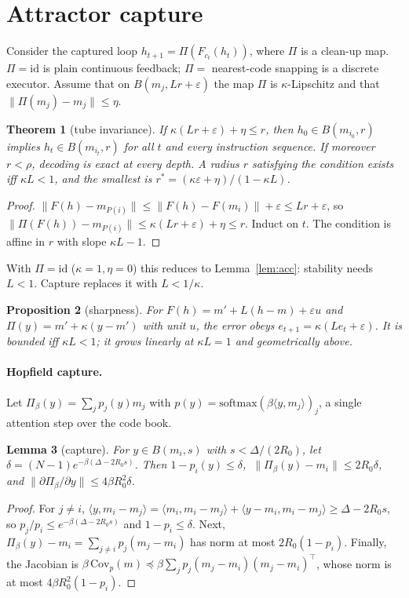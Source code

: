 \documentclass[11pt]{article}
\newtheorem{theorem}{Theorem}
\newtheorem{proposition}[theorem]{Proposition}
\newtheorem{lemma}[theorem]{Lemma}
\theoremstyle{definition}
\theoremstyle{remark}
\newcommand{\norm}[1]{\lVert #1\rVert}
\newcommand{\ip}[2]{\langle #1, #2\rangle}
\begin{document}
\section{Attractor capture}\label{sec:capture}

Consider the captured loop $h_{t+1}=\Pi(F_{c_t}(h_t))$, where $\Pi$ is a clean-up map. $\Pi=\mathrm{id}$
is plain continuous feedback; $\Pi=$ nearest-code snapping is a discrete executor. Assume that on
$B(m_j,Lr+\varepsilon)$ the map $\Pi$ is $\kappa$-Lipschitz and that $\norm{\Pi(m_j)-m_j}\le\eta$.

\begin{theorem}[tube invariance]\label{thm:tube}
If $\kappa(Lr+\varepsilon)+\eta\le r$, then $h_0\in B(m_{i_0},r)$ implies $h_t\in B(m_{i_t},r)$
for all $t$ and every instruction sequence. If moreover $r<\rho$, decoding is exact at every
depth. A radius $r$ satisfying the condition exists iff $\kappa L<1$, and the smallest is
$r^*=(\kappa\varepsilon+\eta)/(1-\kappa L)$.
\end{theorem}
\begin{proof}
$\norm{F(h)-m_{P(i)}}\le\norm{F(h)-F(m_i)}+\varepsilon\le Lr+\varepsilon$, so
$\norm{\Pi(F(h))-m_{P(i)}}\le\kappa(Lr+\varepsilon)+\eta\le r$. Induct on $t$. The condition is
affine in $r$ with slope $\kappa L-1$.
\end{proof}

With $\Pi=\mathrm{id}$ ($\kappa=1,\eta=0$) this reduces to Lemma~\ref{lem:acc}: stability needs
$L<1$. Capture replaces it with $L<1/\kappa$.

\begin{proposition}[sharpness]\label{prop:sharp}
For $F(h)=m'+L(h-m)+\varepsilon u$ and $\Pi(y)=m'+\kappa(y-m')$ with unit $u$, the error obeys
$e_{t+1}=\kappa(Le_t+\varepsilon)$. It is bounded iff $\kappa L<1$; it grows linearly at
$\kappa L=1$ and geometrically above.
\end{proposition}

\paragraph{Hopfield capture.} Let $\Pi_\beta(y)=\sum_j p_j(y)m_j$ with
$p(y)=\mathrm{softmax}(\beta\ip{y}{m_j})_j$, a single attention step over the code book.

\begin{lemma}[capture]\label{lem:capture}
For $y\in B(m_i,s)$ with $s<\Delta/(2R_0)$, let $\delta=(N-1)e^{-\beta(\Delta-2R_0s)}$. Then
$1-p_i(y)\le\delta$, $\ \norm{\Pi_\beta(y)-m_i}\le2R_0\delta$, and
$\norm{\partial\Pi_\beta/\partial y}\le4\beta R_0^2\delta$.
\end{lemma}
\begin{proof}
For $j\ne i$, $\ip{y}{m_i-m_j}=\ip{m_i}{m_i-m_j}+\ip{y-m_i}{m_i-m_j}\ge\Delta-2R_0s$, so
$p_j/p_i\le e^{-\beta(\Delta-2R_0s)}$ and $1-p_i\le\delta$. Next,
$\Pi_\beta(y)-m_i=\sum_{j\ne i}p_j(m_j-m_i)$ has norm at most $2R_0(1-p_i)$. Finally, the
Jacobian is $\beta\,\mathrm{Cov}_p(m)\preceq\beta\sum_jp_j(m_j-m_i)(m_j-m_i)^\top$, whose norm
is at most $4\beta R_0^2(1-p_i)$.
\end{proof}
\end{document}
